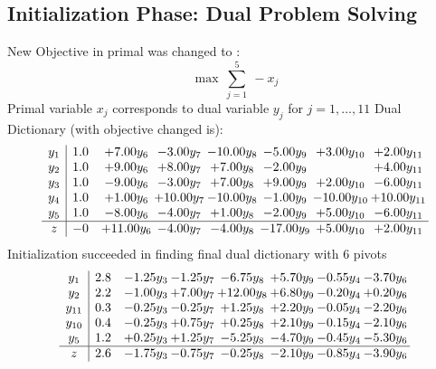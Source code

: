 \documentclass[9pt]{article}
\begin{document}
\subsection{Initialization Phase: Dual Problem Solving}
New Objective in primal was changed to : \[ \max\ \sum_{j=1}^{5}\ - x_j \] 
Primal variable $x_j$ corresponds to dual variable $y_j$ for $j = 1,\ldots,11$
Dual Dictionary (with objective changed is): 
\[\begin{array}{c| c c@{\hskip 2pt} c@{\hskip 2pt} c@{\hskip 2pt} c@{\hskip 2pt} c@{\hskip 2pt} c@{\hskip 2pt} }
 y_{1}   &  1.0 & +  7.00 y_{6} & -3.00 y_{7} & -10.00 y_{8} & -5.00 y_{9} & +  3.00 y_{10} & +  2.00 y_{11}\\
 y_{2}   &  1.0 & +  9.00 y_{6} & +  8.00 y_{7} & +  7.00 y_{8} & -2.00 y_{9} &   & +  4.00 y_{11}\\
 y_{3}   &  1.0 & -9.00 y_{6} & -3.00 y_{7} & +  7.00 y_{8} & +  9.00 y_{9} & +  2.00 y_{10} & -6.00 y_{11}\\
 y_{4}   &  1.0 & +  1.00 y_{6} & + 10.00 y_{7} & -10.00 y_{8} & -1.00 y_{9} & -10.00 y_{10} & + 10.00 y_{11}\\
 y_{5}   &  1.0 & -8.00 y_{6} & -4.00 y_{7} & +  1.00 y_{8} & -2.00 y_{9} & +  5.00 y_{10} & -6.00 y_{11}\\
\hline
z    &  -0 & + 11.00 y_{6} & -4.00 y_{7} & -4.00 y_{8} & -17.00 y_{9} & +  5.00 y_{10} & +  2.00 y_{11}\\
\end{array}\]
Initialization succeeded in finding final dual dictionary with 6 pivots
\[\begin{array}{c| c c@{\hskip 2pt} c@{\hskip 2pt} c@{\hskip 2pt} c@{\hskip 2pt} c@{\hskip 2pt} c@{\hskip 2pt} }
 y_{1}   &  2.8 & -1.25 y_{3} & -1.25 y_{7} & -6.75 y_{8} & +  5.70 y_{9} & -0.55 y_{4} & -3.70 y_{6}\\
 y_{2}   &  2.2 & -1.00 y_{3} & +  7.00 y_{7} & + 12.00 y_{8} & +  6.80 y_{9} & -0.20 y_{4} & +  0.20 y_{6}\\
 y_{11}   &  0.3 & -0.25 y_{3} & -0.25 y_{7} & +  1.25 y_{8} & +  2.20 y_{9} & -0.05 y_{4} & -2.20 y_{6}\\
 y_{10}   &  0.4 & -0.25 y_{3} & +  0.75 y_{7} & +  0.25 y_{8} & +  2.10 y_{9} & -0.15 y_{4} & -2.10 y_{6}\\
 y_{5}   &  1.2 & +  0.25 y_{3} & +  1.25 y_{7} & -5.25 y_{8} & -4.70 y_{9} & -0.45 y_{4} & -5.30 y_{6}\\
\hline
z    &  2.6 & -1.75 y_{3} & -0.75 y_{7} & -0.25 y_{8} & -2.10 y_{9} & -0.85 y_{4} & -3.90 y_{6}\\
\end{array}\]
\end{document}
